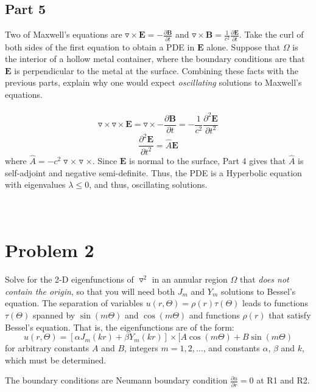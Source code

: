 \documentclass{amsart}
\begin{document}
	\subsection{Part 5}
	Two of Maxwell's equations are $\triangledown\times \mathbf{E} = -\frac{\partial\mathbf{B}}{\partial t}$ and $\triangledown\times\mathbf{B} = \frac{1}{c^2}\frac{\partial\mathbf{E}}{\partial t}$. Take the curl of both sides of the first equation to obtain a PDE in $\mathbf{E}$ alone. Suppose that $\Omega$ is the interior of a hollow metal container, where the boundary conditions are that $\mathbf{E}$ is perpendicular to the metal at the surface. Combining these facts with the previous parts, explain why one would expect \textit{oscillating} solutions to Maxwell's equations.
	\\\\
	\[
	\triangledown\times\triangledown\times\mathbf{E} = \triangledown\times -\frac{\partial \mathbf{B}}{\partial t} = -\frac{1}{c^2}\frac{\partial^2 \mathbf{E}}{\partial t^2}
	\]
	\[
	\frac{\partial^2\mathbf{E}}{\partial t^2} =  \hat{A}\mathbf{E}
	\]
	\noindent
	where $\hat{A}=-c^2 \triangledown\times\triangledown\times$. Since $\mathbf{E}$ is normal to the surface, Part 4 gives that $\hat{A}$ is self-adjoint and negative semi-definite. Thus, the PDE is a Hyperbolic equation with eigenvalues $\lambda\leq0$, and thus, oscillating solutions.
	\\\\\\
	\section{Problem 2}
	Solve for the 2-D eigenfunctions of $\triangledown^2$ in an annular region $\Omega$ that \textit{does not contain the origin}, so that you will need both $J_m$ and $Y_m$ solutions to Bessel's equation. The separation of variables $u(r,\Theta) = \rho(r)\tau(\Theta)$ leads to functions $\tau(\Theta)$ spanned by $\sin(m\Theta)$ and $\cos(m\Theta)$ and functions $\rho(r)$ that satisfy Bessel's equation. That is, the eigenfunctions are of the form:
	\[ u(r,\Theta) = [\alpha J_m(kr) + \beta Y_m(kr)] \times [A\cos(m\Theta) + B\sin(m\Theta) \]
	for arbitrary constants $A$ and $B$, integers $m = 1,2,\dots$, and constants $\alpha$, $\beta$ and $k$, which must be determined.
	
	\noindent
	The boundary conditions are Neumann boundary condition $\frac{\partial u}{\partial r} = 0$ at R1 and R2.
	\\
\end{document}
